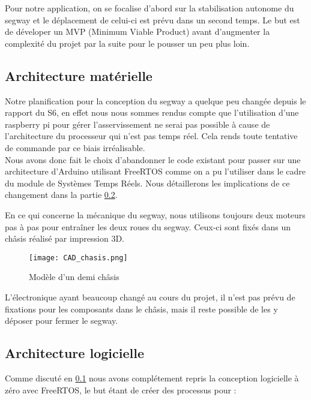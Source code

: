 \documentclass[oneside,a4paper,12pt]{article}
\begin{document}
	Pour notre application, on se focalise d'abord sur la stabilisation autonome du segway et le déplacement de celui-ci est prévu dans un second temps. Le but est de déveloper un MVP (Minimum Viable Product) avant d'augmenter la complexité du projet par la suite pour le pousser un peu plus loin.
	
	\subsection{Architecture matérielle}
	\label{Architecture matérielle}
	
	Notre planification pour la conception du segway a quelque peu changée depuis le rapport du S6, en effet nous nous sommes rendus compte que l'utilisation d'une raspberry pi pour gérer l'asservissement ne serai pas possible à cause de l'architecture du processeur qui n'est pas temps réel. Cela rends toute tentative de commande par ce biais irréalisable.\\
	Nous avons donc fait le choix d'abandonner le code existant pour passer sur une architecture d'Arduino utilisant FreeRTOS comme on a pu l'utiliser dans le cadre du module de Systèmes Temps Réels. Nous détaillerons les implications de ce changement dans la partie  \ref{subsection:Architecture logicielle}.
	
	En ce qui concerne la mécanique du segway, nous utilisons toujours deux moteurs pas à pas pour entraîner les deux roues du segway. Ceux-ci sont fixés dans un châsis réalisé par impression 3D.
	
	\newpage
	
	\begin{figure}[h]
		\centering
		\texttt{[image: CAD\_chasis.png]}
		\caption{Modèle d'un  demi châsis}
	\end{figure}

	L'électronique ayant beaucoup changé au cours du projet, il n'est pas prévu de fixations pour les composants dans le châsis, mais il reste possible de les y déposer pour fermer le segway.
	
	\subsection{Architecture logicielle}
	\label{subsection:Architecture logicielle}
	
	Comme discuté en \ref{Architecture matérielle} nous avons complétement repris la conception logicielle à zéro avec FreeRTOS, le but étant de créer des processus pour :
	
\end{document}
